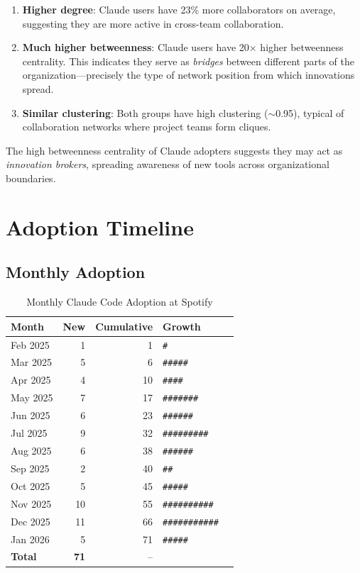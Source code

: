 \documentclass[11pt]{article}
\begin{document}
\begin{enumerate}
    \item \textbf{Higher degree}: Claude users have 23\% more collaborators on average, suggesting they are more active in cross-team collaboration.

    \item \textbf{Much higher betweenness}: Claude users have 20$\times$ higher betweenness centrality. This indicates they serve as \emph{bridges} between different parts of the organization---precisely the type of network position from which innovations spread.

    \item \textbf{Similar clustering}: Both groups have high clustering ($\sim$0.95), typical of collaboration networks where project teams form cliques.
\end{enumerate}

The high betweenness centrality of Claude adopters suggests they may act as \emph{innovation brokers}, spreading awareness of new tools across organizational boundaries.

\section{Adoption Timeline}

\subsection{Monthly Adoption}

\begin{table}[H]
\centering
\caption{Monthly Claude Code Adoption at Spotify}
\label{tab:monthly}
\begin{tabular}{lrrll}
\toprule
\textbf{Month} & \textbf{New} & \textbf{Cumulative} & \textbf{Growth} \\
\midrule
Feb 2025 & 1 & 1 & \texttt{\#} \\
Mar 2025 & 5 & 6 & \texttt{\#\#\#\#\#} \\
Apr 2025 & 4 & 10 & \texttt{\#\#\#\#} \\
May 2025 & 7 & 17 & \texttt{\#\#\#\#\#\#\#} \\
Jun 2025 & 6 & 23 & \texttt{\#\#\#\#\#\#} \\
Jul 2025 & 9 & 32 & \texttt{\#\#\#\#\#\#\#\#\#} \\
Aug 2025 & 6 & 38 & \texttt{\#\#\#\#\#\#} \\
Sep 2025 & 2 & 40 & \texttt{\#\#} \\
Oct 2025 & 5 & 45 & \texttt{\#\#\#\#\#} \\
Nov 2025 & 10 & 55 & \texttt{\#\#\#\#\#\#\#\#\#\#} \\
Dec 2025 & 11 & 66 & \texttt{\#\#\#\#\#\#\#\#\#\#\#} \\
Jan 2026 & 5 & 71 & \texttt{\#\#\#\#\#} \\
\midrule
\textbf{Total} & \textbf{71} & -- & \\
\bottomrule
\end{tabular}
\end{table}
\end{document}
